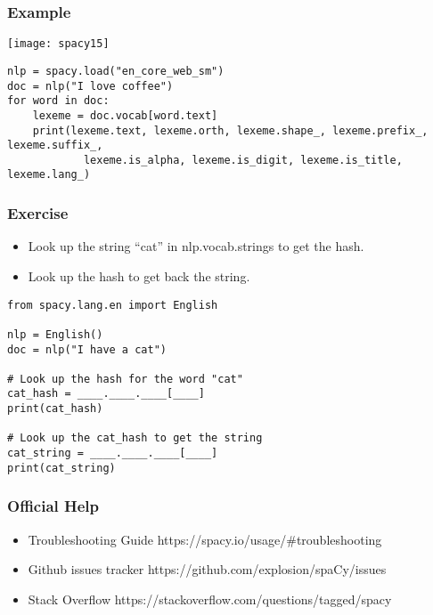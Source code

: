 \begin{frame}[fragile]\frametitle{Example}



	\begin{center}
\texttt{[image: spacy15]}
\end{center}

\begin{lstlisting}
nlp = spacy.load("en_core_web_sm")
doc = nlp("I love coffee")
for word in doc:
    lexeme = doc.vocab[word.text]
    print(lexeme.text, lexeme.orth, lexeme.shape_, lexeme.prefix_, lexeme.suffix_,
            lexeme.is_alpha, lexeme.is_digit, lexeme.is_title, lexeme.lang_)
\end{lstlisting}
\end{frame}

\begin{frame}[fragile]\frametitle{Exercise}

  \begin{itemize}
    \item Look up the string “cat” in nlp.vocab.strings to get the hash.
    \item Look up the hash to get back the string.
  \end{itemize}
	
	
\begin{lstlisting}
from spacy.lang.en import English

nlp = English()
doc = nlp("I have a cat")

# Look up the hash for the word "cat"
cat_hash = ____.____.____[____]
print(cat_hash)

# Look up the cat_hash to get the string
cat_string = ____.____.____[____]
print(cat_string)
\end{lstlisting}




\end{frame}

\begin{frame}[fragile]\frametitle{Official Help}
  \begin{itemize}
    \item Troubleshooting Guide https://spacy.io/usage/\#troubleshooting
		\item Github issues tracker https://github.com/explosion/spaCy/issues
		\item Stack Overflow  https://stackoverflow.com/questions/tagged/spacy
  \end{itemize}
	
	
\end{frame}